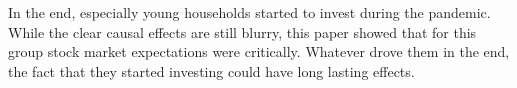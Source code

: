\documentclass[ProjectABM]{subfiles}
\begin{document}
In the end, especially young households started to invest during the pandemic. While the clear causal effects are still blurry, this paper showed that for this group stock market expectations were critically. Whatever drove them in the end, the fact that they started investing could have long lasting effects.



\onlyinsubfile{}
%
\end{document}
